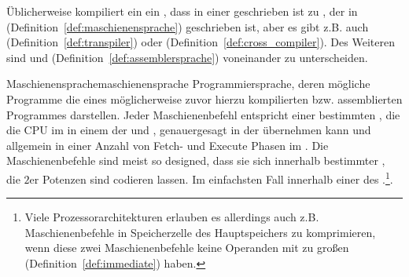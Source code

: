 Üblicherweise kompiliert ein  ein , dass in einer  geschrieben ist zu , der in  (Definition~\ref{def:maschienensprache}) geschrieben ist, aber es gibt z.B. auch  (Definition~\ref{def:transpiler}) oder  (Definition~\ref{def:cross_compiler}). Des Weiteren sind  und  (Definition~\ref{def:assemblersprache}) voneinander zu unterscheiden.

\begin{Definition}{Maschienensprache}{maschienensprache}
  Programmiersprache, deren mögliche Programme die  eines möglicherweise zuvor hierzu kompilierten bzw. assemblierten Programmes darstellen. Jeder Maschienenbefehl entspricht einer bestimmten , die die CPU im  in einem  der  und , genauergesagt in der  übernehmen kann und allgemein in einer  Anzahl von Fetch- und Execute Phasen im . Die Maschienenbefehle sind meist so designed, dass sie sich innerhalb bestimmter , die $2$er Potenzen sind codieren lassen. Im einfachsten Fall innerhalb einer  des .\footnote{Viele Prozessorarchitekturen erlauben es allerdings auch z.B.  Maschienenbefehle in  Speicherzelle des Hauptspeichers zu komprimieren, wenn diese zwei Maschienenbefehle keine Operanden mit zu großen  (Definition~\ref{def:immediate}) haben.}.
\end{Definition}

